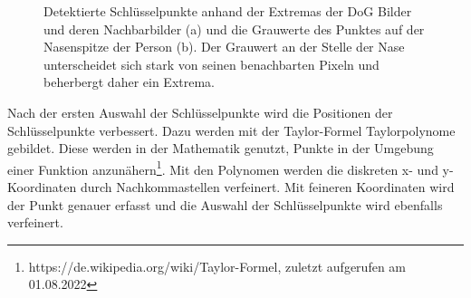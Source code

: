\begin{figure}[H]
    \centering
    \qquad
    \caption[Detektierte Schlüsselpunkte anhand der Extremas der DoG Bilder und deren Nachbarbilder (a) und die Grauwerte des Punktes auf der Nasenspitze der Person (b). Der Grauwert an der Stelle der Nase unterscheidet sich stark von seinen benachbarten Pixeln und beherbergt daher ein Extrema]{Detektierte Schlüsselpunkte anhand der Extremas der DoG Bilder und deren Nachbarbilder (a) und die Grauwerte des Punktes auf der Nasenspitze der Person (b). Der Grauwert an der Stelle der Nase unterscheidet sich stark von seinen benachbarten Pixeln und beherbergt daher ein Extrema\protect\footnotemark.}%
    \label{fig:tracking-sift-features}
\end{figure}


Nach der ersten Auswahl der Schlüsselpunkte wird die Positionen der Schlüsselpunkte verbessert. Dazu werden mit der Taylor-Formel Taylorpolynome gebildet. Diese werden in der Mathematik genutzt, Punkte in der Umgebung einer Funktion anzunähern\footnote{https://de.wikipedia.org/wiki/Taylor-Formel, zuletzt aufgerufen am 01.08.2022}. Mit den Polynomen werden die diskreten x- und y-Koordinaten durch Nachkommastellen verfeinert. Mit feineren Koordinaten wird der Punkt genauer erfasst und die Auswahl der Schlüsselpunkte wird ebenfalls verfeinert.

